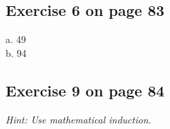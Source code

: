 \documentclass[12pt]{amsart}
\begin{document}
\subsection{Exercise 6 on page 83} $ $\\
a. 49 \\
b. 94

\subsection{Exercise 9 on page 84} $ $\\ 

   \textit{Hint: Use mathematical induction.}
\end{document}
